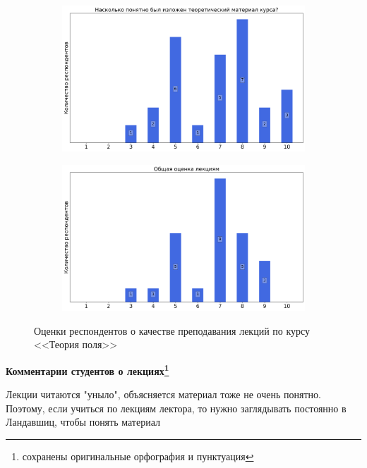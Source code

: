 \begin{figure}[H]
\begin{subfigure}[b]{0.45\textwidth}
			\end{subfigure}
			\begin{subfigure}[b]{0.45\textwidth}
				\centering
				\includegraphics[width=\textwidth]{images/3 course/Теория поля/lecturer-marks-Гец А.В.-2.png}
			\end{subfigure}	
			\begin{subfigure}[b]{0.45\textwidth}
				\centering
				\includegraphics[width=\textwidth]{images/3 course/Теория поля/lecturer-marks-Гец А.В.-3.png}
			\end{subfigure}
			\caption{Оценки респондентов о качестве преподавания лекций по курсу <<Теория поля>>}
		\end{figure}

		\textbf{Комментарии студентов о лекциях\protect\footnote{сохранены оригинальные орфография и пунктуация}}
            \begin{commentbox} 
                Лекции читаются "уныло", объясняется материал тоже не очень понятно. Поэтому, если учиться по лекциям лектора, то нужно заглядывать постоянно в Ландавшиц, чтобы понять материал 
            \end{commentbox} 
        
